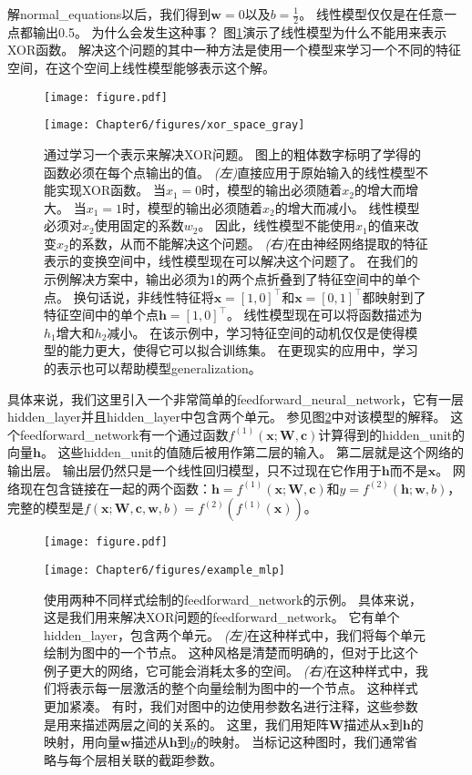 解\gls{normal_equations}以后，我们得到$\bm{w} = 0$以及$b = \frac{1}{2}$。
线性模型仅仅是在任意一点都输出0.5。
为什么会发生这种事？
图\ref{fig:chap6_xor_space_gray}演示了线性模型为什么不能用来表示XOR函数。
解决这个问题的其中一种方法是使用一个模型来学习一个不同的特征空间，在这个空间上线性模型能够表示这个解。
\begin{figure}[!htb]
\ifOpenSource
\centerline{\texttt{[image: figure.pdf]}}
\else
\centerline{\texttt{[image: Chapter6/figures/xor\_space\_gray]}}
\fi
\captionsetup{singlelinecheck=off}
\caption{通过学习一个表示来解决XOR问题。
图上的粗体数字标明了学得的函数必须在每个点输出的值。
\emph{(左)}直接应用于原始输入的线性模型不能实现XOR函数。
当$x_1 = 0$时，模型的输出必须随着$x_2$的增大而增大。
当$x_1 = 1$时，模型的输出必须随着$x_2$的增大而减小。
线性模型必须对$x_2$使用固定的系数$w_2$。
因此，线性模型不能使用$x_1$的值来改变$x_2$的系数，从而不能解决这个问题。 
\emph{(右)}在由神经网络提取的特征表示的变换空间中，线性模型现在可以解决这个问题了。
在我们的示例解决方案中，输出必须为1的两个点折叠到了特征空间中的单个点。
换句话说，非线性特征将$\bm{x} = [1, 0]^\top$和$\bm{x} = [0, 1]^\top$都映射到了特征空间中的单个点$\bm{h} = [1, 0]^\top$。
线性模型现在可以将函数描述为$h_1$增大和$h_2$减小。
在该示例中，学习特征空间的动机仅仅是使得模型的能力更大，使得它可以拟合训练集。
在更现实的应用中，学习的表示也可以帮助模型\gls{generalization}。}
\label{fig:chap6_xor_space_gray}
\end{figure}


具体来说，我们这里引入一个非常简单的\gls{feedforward_neural_network}，它有一层\gls{hidden_layer}并且\gls{hidden_layer}中包含两个单元。
参见图\ref{fig:chap6_example_mlp}中对该模型的解释。
这个\gls{feedforward_network}有一个通过函数$f^{(1)}(\bm{x};\bm{W}, \bm{c})$计算得到的\gls{hidden_unit}的向量$\bm{h}$。
这些\gls{hidden_unit}的值随后被用作第二层的输入。
第二层就是这个网络的输出层。
输出层仍然只是一个线性回归模型，只不过现在它作用于$\bm{h}$而不是$\bm{x}$。
网络现在包含链接在一起的两个函数：$\bm{h}=f^{(1)}(\bm{x}; \bm{W}, \bm{c})$和$y = f^{(2)}(\bm{h}; \bm{w}, b)$，完整的模型是$f(\bm{x}; \bm{W}, \bm{c}, \bm{w}, b) = f^{(2)}(f^{(1)}(\bm{x}))$。
\begin{figure}[!htb]
\ifOpenSource
\centerline{\texttt{[image: figure.pdf]}}
\else
\centerline{\texttt{[image: Chapter6/figures/example\_mlp]}}
\fi
\captionsetup{singlelinecheck=off}
\caption{使用两种不同样式绘制的\gls{feedforward_network}的示例。
具体来说，这是我们用来解决XOR问题的\gls{feedforward_network}。
它有单个\gls{hidden_layer}，包含两个单元。
\emph{(左)}在这种样式中，我们将每个单元绘制为图中的一个节点。
这种风格是清楚而明确的，但对于比这个例子更大的网络，它可能会消耗太多的空间。
\emph{(右)}在这种样式中，我们将表示每一层激活的整个向量绘制为图中的一个节点。
这种样式更加紧凑。
有时，我们对图中的边使用参数名进行注释，这些参数是用来描述两层之间的关系的。
这里，我们用矩阵$\bm{W}$描述从$\bm{x}$到$\bm{h}$的映射，用向量$\bm{w}$描述从$\bm{h}$到$y$的映射。
当标记这种图时，我们通常省略与每个层相关联的截距参数。}
\label{fig:chap6_example_mlp}
\end{figure}


